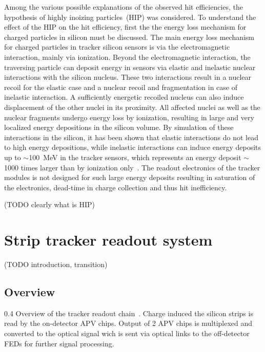 Among the various possible explanations of the observed hit efficiencies, the hypothesis of highly inoizing particles~(HIP) was considered. To understand the effect of the HIP on the hit efficiency, first the the energy loss mechanism for charged particles in silicon must be discussed. The main energy loss mechanism for charged particles in tracker silicon sensors is via the electromagnetic interaction, mainly via ionization. Beyond the electromagnetic interaction, the traversing particle can deposit energy in sensors via elastic and inelastic nuclear interactions with the silicon nucleus. These two interactions result in a nuclear recoil for the elastic case and a nuclear recoil and fragmentation in case of inelastic interaction. A sufficiently energetic recoiled nucleus can also induce displacement of the other nuclei in its proximity. All affected nuclei as well as the nuclear fragments undergo energy loss by ionization, resulting in large and very localized energy depositions in the silicon volume. By simulation of these interactions in the silicon, it has been shown that elastic interactions do not lead to high energy depositions, while inelastic interactions can induce energy deposits up to $\sim$100~MeV in the tracker sensors, which represents an energy deposit $\sim$1000 times larger than by ionization only~\cite{Huhtinen:2002yda}. The readout electronics of the tracker modules is not designed for such large energy deposits resulting in saturation of the electronics, dead-time in charge collection and thus hit inefficiency.

(TODO clearly what is HIP)

\section{Strip tracker readout system}

(TODO introduction, transition)

\subsection{Overview}

                 {0.4}       %
                 {Overview of the tracker readout chain~\cite{Bainbridge:2004jc}. Charge induced the silicon strips is read by the on-detector APV chips. Output of 2 APV chips is multiplexed and converted to the optical signal wich is sent via optical links to the off-detector FEDs for further signal processing. } %

